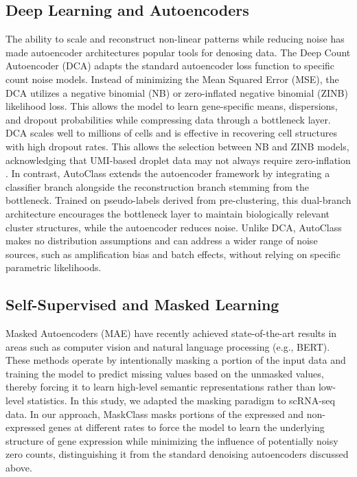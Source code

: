 \documentclass[sigconf,review]{acmart}
\theoremstyle{plain}
\theoremstyle{definition}
\theoremstyle{remark}
\begin{document}
\subsection{Deep Learning and Autoencoders} The ability to scale and reconstruct non-linear patterns while reducing noise has made autoencoder architectures popular tools for denosing data. The Deep Count Autoencoder (DCA) \citep{Eraslan2019DCA} adapts the standard autoencoder loss function to specific count noise models. Instead of minimizing the Mean Squared Error (MSE), the DCA utilizes a negative binomial (NB) or zero-inflated negative binomial (ZINB) likelihood loss. This allows the model to learn gene-specific means, dispersions, and dropout probabilities while compressing data through a bottleneck layer. DCA scales well to millions of cells and is effective in recovering cell structures with high dropout rates. This allows the selection between NB and ZINB models, acknowledging that UMI-based droplet data may not always require zero-inflation \citep{Svensson2020NotZI}. In contrast, AutoClass \citep{Li2022AutoClass} extends the autoencoder framework by integrating a classifier branch alongside the reconstruction branch stemming from the bottleneck. Trained on pseudo-labels derived from pre-clustering, this dual-branch architecture encourages the bottleneck layer to maintain biologically relevant cluster structures, while the autoencoder reduces noise. Unlike DCA, AutoClass makes no distribution assumptions and can address a wider range of noise sources, such as amplification bias and batch effects, without relying on specific parametric likelihoods.

\subsection{Self-Supervised and Masked Learning} Masked Autoencoders (MAE) have recently achieved state-of-the-art results in areas such as computer vision and natural language processing (e.g., BERT). These methods operate by intentionally masking a portion of the input data and training the model to predict missing values based on the unmasked values, thereby forcing it to learn high-level semantic representations rather than low-level statistics. In this study, we adapted the masking paradigm to scRNA-seq data. In our approach, MaskClass masks portions of the expressed and non-expressed genes at different rates to force the model to learn the underlying structure of gene expression while minimizing the influence of potentially noisy zero counts, distinguishing it from the standard denoising autoencoders discussed above.
\end{document}
